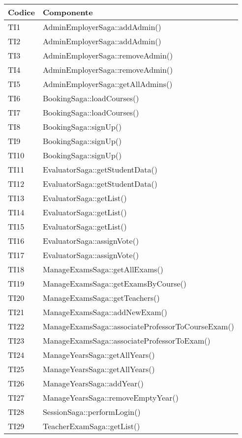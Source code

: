 \documentclass[PianoDiQualifica.tex]{subfiles}
\begin{document}
\begin{longtable}[H]{P{2cm}P{11.5cm}}
	\color{CHeaderText}\textbf{Codice} & 
	\color{CHeaderText}\textbf{Componente} \\
	\endhead
	TI1 & AdminEmployerSaga::addAdmin() \\
	TI2 & AdminEmployerSaga::addAdmin() \\
	TI3 & AdminEmployerSaga::removeAdmin() \\
	TI4 & AdminEmployerSaga::removeAdmin() \\
	TI5 & AdminEmployerSaga::getAllAdmins() \\
	TI6 & BookingSaga::loadCourses() \\
	TI7 & BookingSaga::loadCourses() \\
	TI8 & BookingSaga::signUp() \\
	TI9 & BookingSaga::signUp() \\
	TI10 & BookingSaga::signUp() \\
	TI11 & EvaluatorSaga::getStudentData() \\
	TI12 & EvaluatorSaga::getStudentData() \\
	TI13 & EvaluatorSaga::getList() \\
	TI14 & EvaluatorSaga::getList() \\
	TI15 & EvaluatorSaga::getList() \\
	TI16 & EvaluatorSaga::assignVote() \\
	TI17 & EvaluatorSaga::assignVote() \\
	TI18 & ManageExamsSaga::getAllExams() \\
	TI19 & ManageExamsSaga::getExamsByCourse() \\
	TI20 & ManageExamsSaga::getTeachers() \\
	TI21 & ManageExamsSaga::addNewExam() \\
	TI22 & ManageExamsSaga::associateProfessorToCourseExam() \\
	TI23 & ManageExamsSaga::associateProfessorToExam() \\
	TI24 & ManageYearsSaga::getAllYears() \\
	TI25 & ManageYearsSaga::getAllYears() \\
	TI26 & ManageYearsSaga::addYear() \\
	TI27 & ManageYearsSaga::removeEmptyYear() \\
	TI28 & SessionSaga::performLogin() \\
	TI29 & TeacherExamSaga::getList() \\

\end{longtable}
\end{document}
